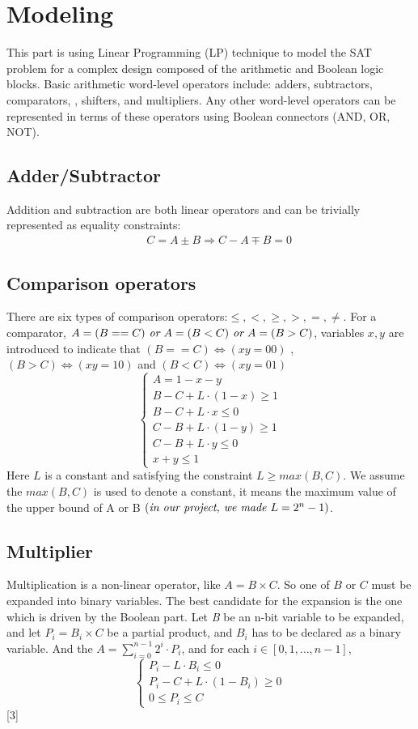 \documentclass[conference,11pt]{IEEEtran}
\begin{document}
\section{Modeling}
This part is using Linear Programming (LP) technique to model the SAT problem for a complex design composed of the arithmetic and Boolean logic blocks. Basic arithmetic word-level operators include: adders, subtractors, comparators, , shifters, and multipliers.  Any other word-level operators can be represented in
terms of these operators using Boolean connectors (AND, OR, NOT).

	\subsection{ Adder/Subtractor}
	Addition and subtraction are both linear operators and can be trivially represented as equality constraints:
	\begin{eqnarray*}
	& &C=A \pm B \Rightarrow C - A  \mp B = 0
	\end{eqnarray*}

	\subsection{ Comparison operators}
	There are six types of comparison operators:$ \leq , < , \geq, > , = , \neq$. For a comparator, $A = (B == C) \emph{ or } A = (B < C) \emph{ or }  A = (B > C)$, variables
$x , y$ are introduced to indicate that $(B==C) \Leftrightarrow (x y = 00)$ , $(B>C) \Leftrightarrow (x y = 10)$ and $(B<C) \Leftrightarrow (x y = 01)$
$$\left\{
\begin{array}{lcl}
{A = 1- x -y} \\
{B - C+ L \cdot (1-x) \geq 1} \\
 {B-C+L\cdot x \leq 0}\\
 {C -B +L\cdot (1-y) \geq 1}\\
  {C -B +L\cdot y \leq 0}\\
  {x +y \leq 1}
\end{array} \right. $$
	Here $L$ is a constant and satisfying the constraint $L \geq max(B,C)$. We assume the $max(B,C)$ is used to denote a constant,  it means the maximum value of the upper bound of A or B $(\emph {in our project, we made } L = 2^n -1)$.

	\subsection{Multiplier}
	Multiplication is a non-linear operator, like $A = B \times C$. So one of $B$ or $C$ must be expanded into binary variables. The best candidate for the expansion is the one which is driven
by the Boolean part. Let \emph{B} be an n-bit variable to be expanded, and let $P_i = B_i \times C$ be a partial product, and $B_i$ has to be declared as a binary variable. And the $A = \sum_{i=0} ^{n-1} 2^i \cdot P_i$, and for each $i \in [0,1,\ldots,n-1] $,
$$\left\{ \begin{array}{l}
{P_i -L \cdot B_i \leq 0} \\
{P_i - C+ L \cdot (1-B_i) \geq 0} \\
{0 \leq P_i \leq C}
\end{array} \right. $$
[3]
\end{document}
